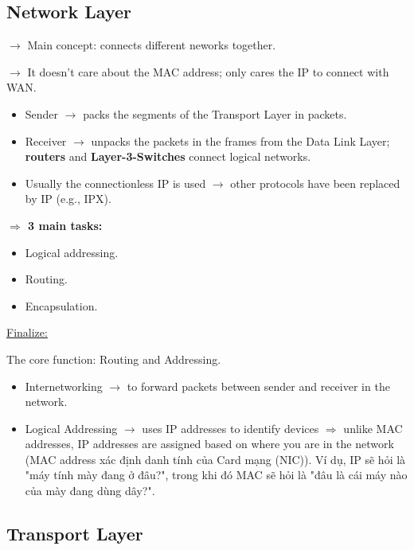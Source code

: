 \subsection{Network Layer}

\noindent
$\rightarrow$ Main concept: connects different neworks together.
\medskip

\noindent
$\rightarrow$ It doesn't care about the MAC address; only cares the IP to connect with WAN.
\medskip

\begin{itemize}
    \item Sender $\rightarrow$ packs the segments of the Transport Layer in packets.
    \item Receiver $\rightarrow$ unpacks the packets in the frames from the Data Link Layer; \textbf{routers} and \textbf{Layer-3-Switches} connect logical networks.
    \item Usually the connectionless IP is used $\rightarrow$ other protocols have been replaced by IP (e.g., IPX).
\end{itemize}

\noindent
\textbf{$\Rightarrow$ 3 main tasks:}

\begin{itemize}
    \item Logical addressing.
    \item Routing.
    \item Encapsulation.
\end{itemize}

\noindent
\underline{Finalize:}
\medskip

\noindent
The core function: Routing and Addressing.

\begin{itemize}
    \item Internetworking $\rightarrow$ to forward packets between sender and receiver in the network.
    \item Logical Addressing $\rightarrow$ uses IP addresses to identify devices $\Rightarrow$ unlike MAC addresses, IP addresses are assigned based on where you are in the network (MAC address xác định danh tính của Card mạng (NIC)). Ví dụ, IP sẽ hỏi là "máy tính mày đang ở đâu?", trong khi đó MAC sẽ hỏi là "đâu là cái máy nào của mày đang dùng dây?".
\end{itemize}
\medskip

\subsection{Transport Layer}

